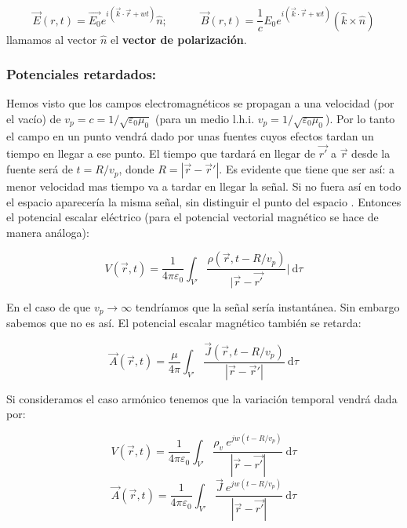 \documentclass[12pt]{article}
\newcommand{\D}{\mathrm{d}}
\newcommand{\tquad}{\quad \quad \quad}
\begin{document}
\begin{equation}
\vec{E}(r,t) = \vec{E_0} e^{i (\vec{k}\cdot \vec{r} + wt)} \widehat{n}; \tquad \vec{B}(r,t) = \dfrac{1}{c} E_0 e^{i (\vec{k} \cdot \vec{r} + wt)} (\widehat{k} \times \widehat{n})
\end{equation}
llamamos al vector $\widehat{n}$ el \textbf{vector de polarización}.

\subsubsection{Potenciales retardados:}

Hemos visto que los campos electromagnéticos se propagan a una velocidad (por el vacío) de $v_p = c = 1/\sqrt{\varepsilon_0 \mu_0}$ (para un medio l.h.i. $v_p = 1/\sqrt{\varepsilon_0 \mu_0}$). Por lo tanto el campo en un punto vendrá dado por unas fuentes cuyos efectos tardan un tiempo en llegar a ese punto.  El tiempo que tardará en llegar de $\vec{r'}$ a $\vec{r}$ desde la fuente será de $t = R/v_p$, donde $R = |\vec{r}-\vec{r}'|$. Es evidente que tiene que ser así: a menor velocidad mas tiempo va a tardar en llegar la señal. Si no fuera así en todo el espacio aparecería la misma señal, sin distinguir el punto del espacio . Entonces el potencial escalar eléctrico (para el potencial vectorial magnético se hace de manera análoga):

\begin{equation}
V(\vec{r},t) = \dfrac{1}{4 \pi \varepsilon_0} \int_{V'} \dfrac{\rho (\vec{r},t-R/v_p)}{|\vec{r}- \vec{r'}}| \ \D \tau
\end{equation}

En el caso de que $v_p \rightarrow \infty$ tendríamos que la señal sería instantánea. Sin embargo sabemos que no es así. El potencial escalar magnético también se retarda:

\begin{equation}
\vec{A} (\vec{r},t) = \dfrac{\mu}{4 \pi} \int_{V'} \dfrac{\vec{J}(\vec{r},t-R/v_p)}{|\vec{r}- \vec{r}'|} \ \D \tau
\end{equation} 

Si consideramos el caso armónico tenemos que la variación temporal vendrá dada por:

\begin{equation}
V(\vec{r},t) = \dfrac{1}{4 \pi \varepsilon_0} \int_{V'} \dfrac{\rho_v \  e^{jw(t-R/v_p)}}{|\vec{r}-\vec{r'}|} \ \D \tau
\end{equation}
\begin{equation}
\vec{A}(\vec{r},t) = \dfrac{1}{4 \pi \varepsilon_0} \int_{V'} \dfrac{\vec{J} \  e^{jw(t-R/v_p)}}{|\vec{r}-\vec{r'}|} \ \D \tau
\end{equation}
\end{document}
